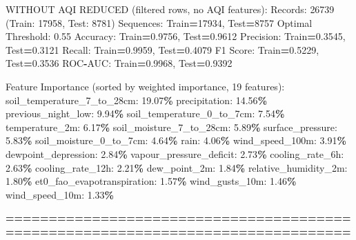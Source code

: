 \documentclass[
  letterpaper,
  DIV=11,
  numbers=noendperiod]{scrartcl}
\newenvironment{Shaded}{\begin{snugshade}}{\end{snugshade}}
\newcommand{\BuiltInTok}[1]{#1}
\newcommand{\DecValTok}[1]{\textcolor[rgb]{0.00,0.00,0.81}{#1}}
\newcommand{\FloatTok}[1]{\textcolor[rgb]{0.00,0.00,0.81}{#1}}
\newcommand{\NormalTok}[1]{#1}
\newcommand{\OperatorTok}[1]{\textcolor[rgb]{0.81,0.36,0.00}{\textbf{#1}}}
\begin{document}
\begin{Shaded}
\begin{Highlighting}[]
\NormalTok{WITHOUT AQI REDUCED (filtered rows, no AQI features):}
\NormalTok{  Records: }\DecValTok{26739}\NormalTok{ (Train: }\DecValTok{17958}\NormalTok{, Test: }\DecValTok{8781}\NormalTok{)}
\NormalTok{  Sequences: Train}\OperatorTok{=}\DecValTok{17934}\NormalTok{, Test}\OperatorTok{=}\DecValTok{8757}
\NormalTok{  Optimal Threshold: }\FloatTok{0.55}
\NormalTok{  Accuracy: Train}\OperatorTok{=}\FloatTok{0.9756}\NormalTok{, Test}\OperatorTok{=}\FloatTok{0.9612}
\NormalTok{  Precision: Train}\OperatorTok{=}\FloatTok{0.3545}\NormalTok{, Test}\OperatorTok{=}\FloatTok{0.3121}
\NormalTok{  Recall: Train}\OperatorTok{=}\FloatTok{0.9959}\NormalTok{, Test}\OperatorTok{=}\FloatTok{0.4079}
\NormalTok{  F1 Score: Train}\OperatorTok{=}\FloatTok{0.5229}\NormalTok{, Test}\OperatorTok{=}\FloatTok{0.3536}
\NormalTok{  ROC}\OperatorTok{{-}}\NormalTok{AUC: Train}\OperatorTok{=}\FloatTok{0.9968}\NormalTok{, Test}\OperatorTok{=}\FloatTok{0.9392}

\NormalTok{  Feature Importance (}\BuiltInTok{sorted}\NormalTok{ by weighted importance, }\DecValTok{19}\NormalTok{ features):}
\NormalTok{    soil\_temperature\_7\_to\_28cm: }\FloatTok{19.07}\OperatorTok{\%}
\NormalTok{    precipitation: }\FloatTok{14.56}\OperatorTok{\%}
\NormalTok{    previous\_night\_low: }\FloatTok{9.94}\OperatorTok{\%}
\NormalTok{    soil\_temperature\_0\_to\_7cm: }\FloatTok{7.54}\OperatorTok{\%}
\NormalTok{    temperature\_2m: }\FloatTok{6.17}\OperatorTok{\%}
\NormalTok{    soil\_moisture\_7\_to\_28cm: }\FloatTok{5.89}\OperatorTok{\%}
\NormalTok{    surface\_pressure: }\FloatTok{5.83}\OperatorTok{\%}
\NormalTok{    soil\_moisture\_0\_to\_7cm: }\FloatTok{4.64}\OperatorTok{\%}
\NormalTok{    rain: }\FloatTok{4.06}\OperatorTok{\%}
\NormalTok{    wind\_speed\_100m: }\FloatTok{3.91}\OperatorTok{\%}
\NormalTok{    dewpoint\_depression: }\FloatTok{2.84}\OperatorTok{\%}
\NormalTok{    vapour\_pressure\_deficit: }\FloatTok{2.73}\OperatorTok{\%}
\NormalTok{    cooling\_rate\_6h: }\FloatTok{2.63}\OperatorTok{\%}
\NormalTok{    cooling\_rate\_12h: }\FloatTok{2.21}\OperatorTok{\%}
\NormalTok{    dew\_point\_2m: }\FloatTok{1.84}\OperatorTok{\%}
\NormalTok{    relative\_humidity\_2m: }\FloatTok{1.80}\OperatorTok{\%}
\NormalTok{    et0\_fao\_evapotranspiration: }\FloatTok{1.57}\OperatorTok{\%}
\NormalTok{    wind\_gusts\_10m: }\FloatTok{1.46}\OperatorTok{\%}
\NormalTok{    wind\_speed\_10m: }\FloatTok{1.33}\OperatorTok{\%}

\OperatorTok{================================================================================}


\end{Highlighting}
\end{Shaded}
\end{document}
